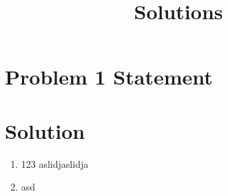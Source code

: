 \documentclass{article}
\begin{document}


\section*{Problem 1 Statement}

\section*{Solution}


\title{Solutions}
\begin{enumerate}
        \item 123
aslidjaslidja
        \item asd

\end{enumerate}
\end{document}
